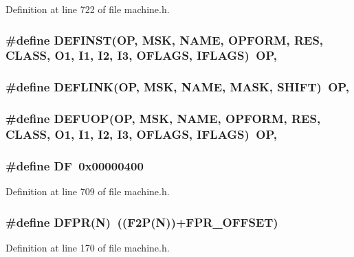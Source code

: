 Definition at line 722 of file machine.h.
\subsubsection[{DEFINST}]{\setlength{\rightskip}{0pt plus 5cm}\#define DEFINST(OP, \/  MSK, \/  NAME, \/  OPFORM, \/  RES, \/  CLASS, \/  O1, \/  I1, \/  I2, \/  I3, \/  OFLAGS, \/  IFLAGS)~OP,}\label{machine_8h_3dac524d674aacd2aec87434a0218790}


\subsubsection[{DEFLINK}]{\setlength{\rightskip}{0pt plus 5cm}\#define DEFLINK(OP, \/  MSK, \/  NAME, \/  MASK, \/  SHIFT)~OP,}\label{machine_8h_e2e57a47696d1134596738df09c2a5f2}


\subsubsection[{DEFUOP}]{\setlength{\rightskip}{0pt plus 5cm}\#define DEFUOP(OP, \/  MSK, \/  NAME, \/  OPFORM, \/  RES, \/  CLASS, \/  O1, \/  I1, \/  I2, \/  I3, \/  OFLAGS, \/  IFLAGS)~OP,}\label{machine_8h_0e42fe68ed769b47e914b06400365fcb}


\subsubsection[{DF}]{\setlength{\rightskip}{0pt plus 5cm}\#define DF~0x00000400}\label{machine_8h_0ad2d5d4043d3b7508e2a4da99d6f673}




Definition at line 709 of file machine.h.
\subsubsection[{DFPR}]{\setlength{\rightskip}{0pt plus 5cm}\#define DFPR(N)~((F2P(N))+FPR\_\-OFFSET)}\label{machine_8h_9b5b2a66039d753b3fd83aea30ba467c}




Definition at line 170 of file machine.h.
